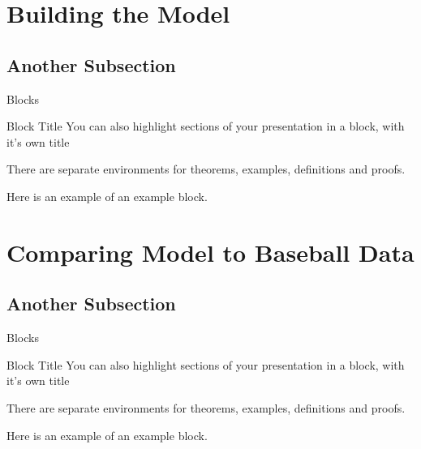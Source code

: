 \documentclass{beamer}
\begin{document}
\section{Building the Model}

    \subsection{Another Subsection}

    \begin{frame}{Blocks}
    \begin{block}{Block Title}
    You can also highlight sections of your presentation in a block, with it's own title
    \end{block}
    \begin{theorem}
    There are separate environments for theorems, examples, definitions and proofs.
    \end{theorem}
    \begin{example}
    Here is an example of an example block.
    \end{example}
    \end{frame}

\section{Comparing Model to Baseball Data}

    \subsection{Another Subsection}

    \begin{frame}{Blocks}
    \begin{block}{Block Title}
    You can also highlight sections of your presentation in a block, with it's own title
    \end{block}
    \begin{theorem}
    There are separate environments for theorems, examples, definitions and proofs.
    \end{theorem}
    \begin{example}
    Here is an example of an example block.
    \end{example}
    \end{frame}

\end{document}
